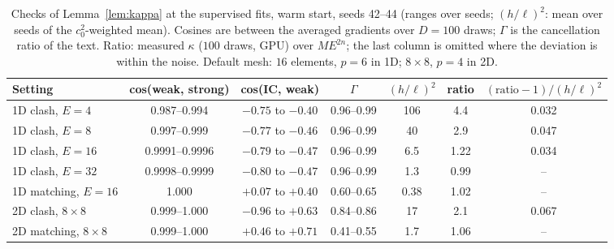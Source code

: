 \documentclass[a4paper,fleqn]{cas-sc}
\begin{document}
\begin{table}[htbp]
\centering
\caption{Checks of Lemma~\ref{lem:kappa} at the supervised fits, warm start, seeds 42--44 (ranges over seeds; $(h/\ell)^2$:
mean over seeds of the $c_0^2$-weighted mean). Cosines are between the averaged gradients over $D=100$ draws; $\Gamma$ is
the cancellation ratio of the text. Ratio: measured $\kappa$ ($100$ draws, GPU) over $ME^{2n}$; the last column is omitted where the deviation is within the noise. Default mesh: $16$
elements, $p=6$ in 1D; $8\times8$, $p=4$ in 2D.}
\label{tab:align}
\small
\setlength{\tabcolsep}{3pt}
\begin{tabular}{lcccccc}
\toprule
Setting & cos(weak, strong) & cos(IC, weak) & $\Gamma$ & $(h/\ell)^2$ & ratio & $(\text{ratio}-1)/(h/\ell)^2$ \\
\midrule
1D clash, $E=4$ & 0.987--0.994 & $-0.75$ to $-0.40$ & 0.96--0.99 & 106 & 4.4 & 0.032 \\
1D clash, $E=8$ & 0.997--0.999 & $-0.77$ to $-0.46$ & 0.96--0.99 & 40 & 2.9 & 0.047 \\
1D clash, $E=16$ & 0.9991--0.9996 & $-0.79$ to $-0.47$ & 0.96--0.99 & 6.5 & 1.22 & 0.034 \\
1D clash, $E=32$ & 0.9998--0.9999 & $-0.80$ to $-0.47$ & 0.96--0.99 & 1.3 & 0.99 & -- \\
1D matching, $E=16$ & 1.000 & $+0.07$ to $+0.40$ & 0.60--0.65 & 0.38 & 1.02 & -- \\
2D clash, $8\times8$ & 0.999--1.000 & $-0.96$ to $+0.63$ & 0.84--0.86 & 17 & 2.1 & 0.067 \\
2D matching, $8\times8$ & 0.999--1.000 & $+0.46$ to $+0.71$ & 0.41--0.55 & 1.7 & 1.06 & -- \\
\bottomrule
\end{tabular}
\end{table}
\end{document}
